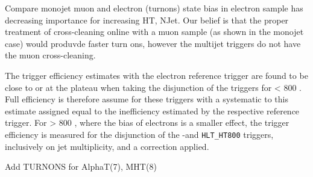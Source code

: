 {\color{blue} Compare monojet muon and electron (turnons) state bias in electron sample has decreasing importance for increasing HT, NJet. 
Our belief is that the proper treatment of cross-cleaning online with a muon sample (as shown in the monojet case) would produvde faster
turn ons, however the multijet triggers do not have the muon cross-cleaning. 

The trigger efficiency estimates with the electron reference trigger are found to be close to or at the plateau when taking the disjunction of the 
triggers for \scalht < 800 \GeV. Full efficiency is therefore assume for these triggers with a systematic to this estimate assigned equal to the 
inefficiency estimated by the respective reference trigger. For \scalht > 800 \GeV, where the bias of electrons is a smaller effect, the trigger 
efficiency is measured for the disjunction of the \scalht-\alphat and \verb!HLT_HT800! triggers, inclusively on jet multiplicity, and a correction applied. 

Add TURNONS for AlphaT(7), MHT(8) }


